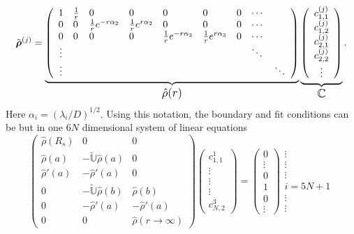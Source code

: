 \begin{equation}
    \tilde{\boldsymbol{\mathbf{\rho}}}^{(j)} = \underbrace{ \left( \begin{array}{cllllllll}
       1   & \frac{1}{r}   & 0                 & 0                 & 0              & 0             & 0 & \cdots &\\
       0   & 0             &\frac{1}{r} e^{-r \alpha_2}   &\frac{1}{r} e^{r \alpha_2 }   & 0              & 0             & 0 & \cdots &\\
       0   & 0             & 0                 & 0                 &\frac{1}{r} e^{-r\alpha_3} &\frac{1}{r} e^{r\alpha_3} & 0 & \cdots &\\
       \vdots  &&&&&&&\ddots &\\
       \vdots  &&&&&&&&\ddots
   \end{array} \right)}_\text{\large$\hat{\rho}(r)$}
   \underbrace{\left(\begin{array}{c}  
       c_{1,1}^{(j)} \\ 
       c_{1,2}^{(j)} \\ 
       c_{2,1}^{(j)} \\ 
       c_{2,2}^{(j)}  \\ 
       \vdots 
   \end{array} \right)}_\text{\large$\mathbb{C}$}.
\end{equation}
Here $\alpha_i = (\lambda_i / D)^{1/2}$. Using this notation, the boundary and fit conditions can be but in one $6 N$ dimensional system of linear equations
\begin{equation}
    \left( \begin{array}{lll}
        \hat{\rho}(R_s) & 0 & 0 \\
        \hat{\rho}(a)   & -\tilde{\mathbb{U}}\hat{\rho}(a) & 0 \\
        \hat{\rho}'(a) & -\hat{\rho}'(a) & 0 \\
        0 &  -\tilde{\mathbb{U}}\hat{\rho}(b) & \hat{\rho}(b) \\
        0 &  -\hat{\rho}'(a) & - \hat{\rho}'(a) \\
        0 & 0 & \hat{\rho}(r\rightarrow \infty)
    \end{array}\right) \left( \begin{array}{c} c_{1,1}^{1} \\ \vdots \\ \vdots \\ \vdots \\ c_{N,2}^{3} \end{array} \right) = 
    \left( \begin{array}{c} 0 \\ \vdots \\ 0 \\ 1 \\ 0 \\ \vdots \end{array} \right) \begin{array}{c} \vdots \\ \vdots \\ \vdots \\ i = 5N+1 \\ \vdots \\ \vdots \end{array}
    \label{lgs}
\end{equation}
